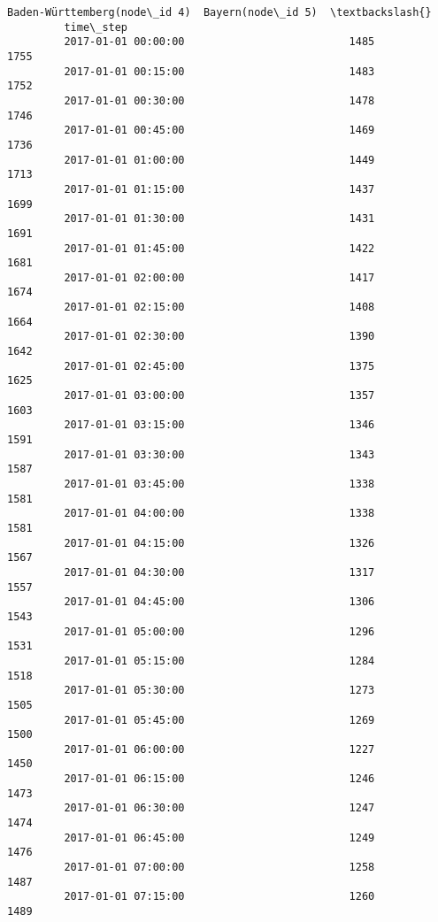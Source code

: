 \documentclass[11pt]{article}
\begin{document}
\begin{Verbatim}[commandchars=\\\{\}]
                              Baden-Württemberg(node\_id 4)  Bayern(node\_id 5)  \textbackslash{}
         time\_step                                                              
         2017-01-01 00:00:00                          1485               1755   
         2017-01-01 00:15:00                          1483               1752   
         2017-01-01 00:30:00                          1478               1746   
         2017-01-01 00:45:00                          1469               1736   
         2017-01-01 01:00:00                          1449               1713   
         2017-01-01 01:15:00                          1437               1699   
         2017-01-01 01:30:00                          1431               1691   
         2017-01-01 01:45:00                          1422               1681   
         2017-01-01 02:00:00                          1417               1674   
         2017-01-01 02:15:00                          1408               1664   
         2017-01-01 02:30:00                          1390               1642   
         2017-01-01 02:45:00                          1375               1625   
         2017-01-01 03:00:00                          1357               1603   
         2017-01-01 03:15:00                          1346               1591   
         2017-01-01 03:30:00                          1343               1587   
         2017-01-01 03:45:00                          1338               1581   
         2017-01-01 04:00:00                          1338               1581   
         2017-01-01 04:15:00                          1326               1567   
         2017-01-01 04:30:00                          1317               1557   
         2017-01-01 04:45:00                          1306               1543   
         2017-01-01 05:00:00                          1296               1531   
         2017-01-01 05:15:00                          1284               1518   
         2017-01-01 05:30:00                          1273               1505   
         2017-01-01 05:45:00                          1269               1500   
         2017-01-01 06:00:00                          1227               1450   
         2017-01-01 06:15:00                          1246               1473   
         2017-01-01 06:30:00                          1247               1474   
         2017-01-01 06:45:00                          1249               1476   
         2017-01-01 07:00:00                          1258               1487   
         2017-01-01 07:15:00                          1260               1489   

\end{Verbatim}
\end{document}
